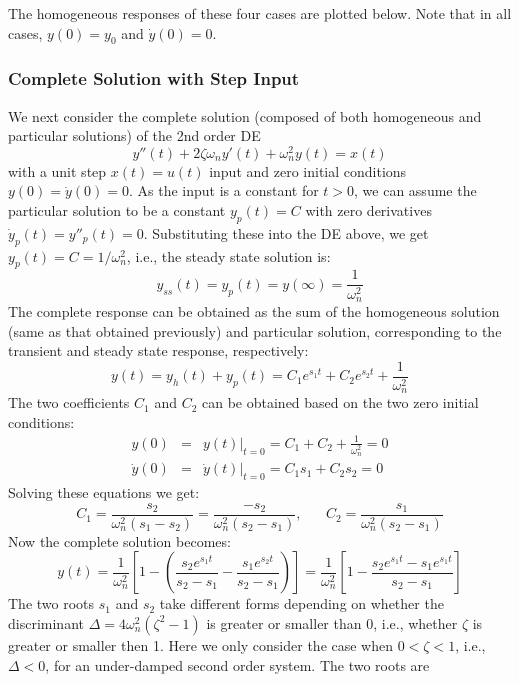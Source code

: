 The homogeneous responses of these four cases are plotted below. Note that in all cases,
$y(0)=y_0$ and $\dot{y}(0)=0$.




\subsubsection*{Complete Solution with Step Input}

We next consider the complete solution (composed of both homogeneous and 
particular solutions) of the 2nd order DE
\[
y''(t)+2\zeta\omega_n y'(t)+\omega_n^2 y(t)=x(t) 
\]
with a unit step $x(t)=u(t)$ input and zero initial conditions 
$y(0)=\dot{y}(0)=0$. As the input is a constant for $t>0$, we can assume 
the particular solution to be a constant $y_p(t)=C$ with zero derivatives
$\dot{y}_p(t)=y''_p(t)=0$. Substituting these into the DE above, we
get $y_p(t)=C=1/\omega_n^2$, i.e., the steady state solution is:
\[
y_{ss}(t)=y_p(t)=y(\infty)=\frac{1}{\omega_n^2} 
\]
The complete response can be obtained as the sum of the homogeneous 
solution (same as that obtained previously) and particular solution, 
corresponding to the transient and steady state response, respectively:
\[
y(t)=y_h(t)+y_p(t)=C_1 e^{s_1t}+C_2 e^{s_2t}+\frac{1}{\omega_n^2} 
\]
The two coefficients $C_1$ and $C_2$ can be obtained based on the two 
zero initial conditions:
\begin{eqnarray}
  y(0)&=&y(t)\bigg|_{t=0}=C_1+C_2+\frac{1}{\omega_n^2}=0 
  \nonumber \\
  \dot{y}(0)&=&\dot{y}(t)\bigg|_{t=0}=C_1s_1+C_2s_2=0 
  \nonumber
\end{eqnarray}
Solving these equations we get:
\[
C_1=\frac{s_2}{\omega_n^2(s_1-s_2)}=\frac{-s_2}{\omega_n^2(s_2-s_1)},
\;\;\;\;\;\;C_2=\frac{s_1}{\omega_n^2(s_2-s_1)} 
\]
Now the complete solution becomes:
\[
y(t)=\frac{1}{\omega_n^2}\left[1-\left(\frac{s_2e^{s_1t}}{s_2-s_1}
  -\frac{s_1e^{s_2t}}{s_2-s_1}\right)\right] 
=\frac{1}{\omega_n^2}\left[1-\frac{s_2e^{s_1t}-s_1e^{s_1t}}{s_2-s_1}\right]
\]
The two roots $s_1$ and $s_2$ take different forms depending on 
whether the discriminant $\Delta=4\omega_n^2(\zeta^2-1)$ is greater
or smaller than 0, i.e., whether $\zeta$ is greater or smaller then 1.
Here we only consider the case when $0 < \zeta < 1$, i.e., $\Delta<0$,
for an under-damped second order system. The two roots are
